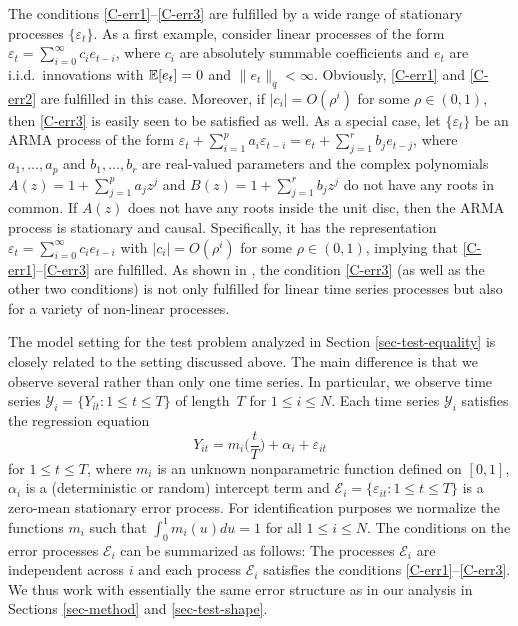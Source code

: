 \documentclass[a4paper,12pt]{article}
\numberwithin{equation}{section}
\begin{document}
The conditions \ref{C-err1}--\ref{C-err3} are fulfilled by a wide range of stationary processes $\{\varepsilon_t\}$. As a first example, consider linear processes of the form $\varepsilon_t = \sum\nolimits_{i=0}^{\infty} c_i e_{t-i}$, where $c_i$ are absolutely summable coefficients and $e_t$ are i.i.d.\ innovations with $\mathbb{E}[e_t] = 0$ and $\| e_t\|_q < \infty$. Obviously, \ref{C-err1} and \ref{C-err2} are fulfilled in this case. Moreover, if $|c_i| = O(\rho^i)$ for some $\rho \in (0,1)$, then \ref{C-err3} is easily seen to be satisfied as well. As a special case, let $\{\varepsilon_t\}$ be an ARMA process of the form $\varepsilon_t + \sum\nolimits_{i=1}^p a_i \varepsilon_{t-i} = e_t + \sum\nolimits_{j=1}^r b_j e_{t-j}$, where $a_1,\ldots,a_p$ and $b_1,\ldots,b_r$ are real-valued parameters and the complex polynomials $A(z) = 1 + \sum\nolimits_{j=1}^p a_jz^j$ and $B(z) = 1 + \sum\nolimits_{j=1}^r b_jz^j$ do not have any roots in common. If $A(z)$ does not have any roots inside the unit disc, then the ARMA process is stationary and causal. Specifically, it has the representation $\varepsilon_t = \sum\nolimits_{i=0}^{\infty} c_i e_{t-i}$ with $|c_i| = O(\rho^i)$ for some $\rho \in (0,1)$, implying that \ref{C-err1}--\ref{C-err3} are fulfilled. As shown in \cite{WuShao2004}, the condition \ref{C-err3} (as well as the other two conditions) is not only fulfilled for linear time series processes but also for a variety of non-linear processes. 


The model setting for the test problem analyzed in Section \ref{sec-test-equality} is closely related to the setting discussed above. The main difference is that we observe several rather than only one time series. In particular, we observe time series $\mathcal{Y}_i = \{Y_{it}: 1 \le t \le T \}$ of length~$T$ for $1 \le i \le N$. Each time series $\mathcal{Y}_i$ satisfies the regression equation \begin{equation}\label{model2}
Y_{it} = m_i \Big( \frac{t}{T} \Big) + \alpha_i + \varepsilon_{it} 
\end{equation}
for $1 \le t \le T$, where $m_i$ is an unknown nonparametric function defined on $[0,1]$, $\alpha_i$ is a (deterministic or random) intercept term and $\mathcal{E}_i = \{ \varepsilon_{it}: 1 \le t \le T \}$ is a zero-mean stationary error process. For identification purposes we normalize the functions $m_i$ such that $\int_0^1 m_i(u) du = 1$ for all $1 \le i \le N$. The conditions on the error processes $\mathcal{E}_i$ can be summarized as follows: The processes $\mathcal{E}_i$ are independent across $i$ and each process $\mathcal{E}_i$ satisfies the conditions \ref{C-err1}--\ref{C-err3}. We thus work with essentially the same error structure as in our analysis in Sections \ref{sec-method} and \ref{sec-test-shape}.
\end{document}
